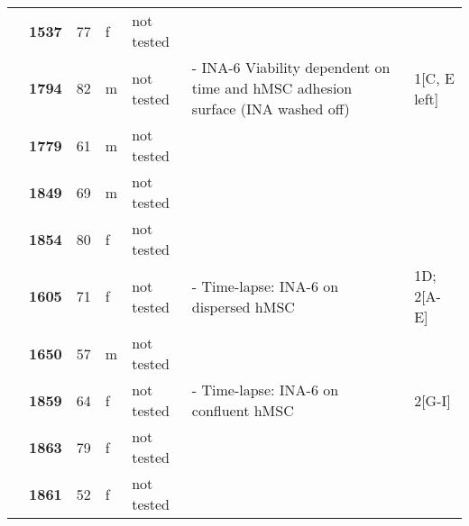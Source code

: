 {\begin{longtable}{|>{\bfseries}p{1.5cm}|>{\bfseries}p{1.2cm}|p{1cm}|p{1cm}|p{2.3cm}|p{6cm}|p{1.7cm}|}
    \hhline{~----~~}
                      & 1537  & 77 & f & not tested &                                                                                                          &                                         \\
    \hhline{~------}
                      & 1794  & 82 & m & not tested & - INA-6 Viability dependent on time and hMSC adhesion surface (INA washed off)                           & 1[C, E left]                            \\
    \hhline{~----~~}
                      & 1779  & 61 & m & not tested &                                                                                                          &                                         \\
    \hhline{~----~~}
                      & 1849  & 69 & m & not tested &                                                                                                          &                                         \\
    \hhline{~----~~}
                      & 1854  & 80 & f & not tested &                                                                                                          &                                         \\
    \hhline{~------}
                      & 1605  & 71 & f & not tested & - Time-lapse: INA-6 on dispersed hMSC                                                                    & 1D; 2[A-E]                              \\
    \hhline{~----~~}
                      & 1650  & 57 & m & not tested &                                                                                                          &                                         \\
    \hhline{~------}
                      & 1859  & 64 & f & not tested & - Time-lapse: INA-6 on confluent hMSC                                                                    & 2[G-I]                                  \\
    \hhline{~----~~}
                      & 1863  & 79 & f & not tested &                                                                                                          &                                         \\
    \hhline{~----~~}
                      & 1861  & 52 & f & not tested &                                                                                                          &                                         \\

\end{longtable}}
